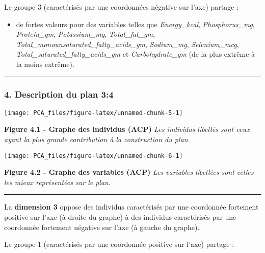 \documentclass[]{article}
\providecommand{\tightlist}{%
  \setlength{\itemsep}{0pt}\setlength{\parskip}{0pt}}
\begin{document}
Le groupe 3 (caractérisés par une coordonnées négative sur l'axe)
partage :

\begin{itemize}
\tightlist
\item
  de fortes valeurs pour des variables telles que \emph{Energy\_kcal},
  \emph{Phosphorus\_mg}, \emph{Protein\_gm}, \emph{Potassium\_mg},
  \emph{Total\_fat\_gm},
  \emph{Total\_monounsaturated\_fatty\_acids\_gm}, \emph{Sodium\_mg},
  \emph{Selenium\_mcg}, \emph{Total\_saturated\_fatty\_acids\_gm} et
  \emph{Carbohydrate\_gm} (de la plus extrême à la moins extrême).
\end{itemize}

\begin{center}\rule{0.5\linewidth}{\linethickness}\end{center}

\subsubsection{4. Description du plan 3:4}\label{description-du-plan-34}

\begin{center}\texttt{[image: PCA\_files/figure-latex/unnamed-chunk-5-1]} \end{center}

\textbf{Figure 4.1 - Graphe des individus (ACP)} \emph{Les individus
libellés sont ceux ayant la plus grande contribution à la construction
du plan.}

\begin{center}\texttt{[image: PCA\_files/figure-latex/unnamed-chunk-6-1]} \end{center}

\textbf{Figure 4.2 - Graphe des variables (ACP)} \emph{Les variables
libellées sont celles les mieux représentées sur le plan.}

\begin{center}\rule{0.5\linewidth}{\linethickness}\end{center}

La \textbf{dimension 3} oppose des individus caractérisés par une
coordonnée fortement positive sur l'axe (à droite du graphe) à des
individus caractérisés par une coordonnée fortement négative sur l'axe
(à gauche du graphe).

Le groupe 1 (caractérisés par une coordonnée positive sur l'axe) partage
:
\end{document}
